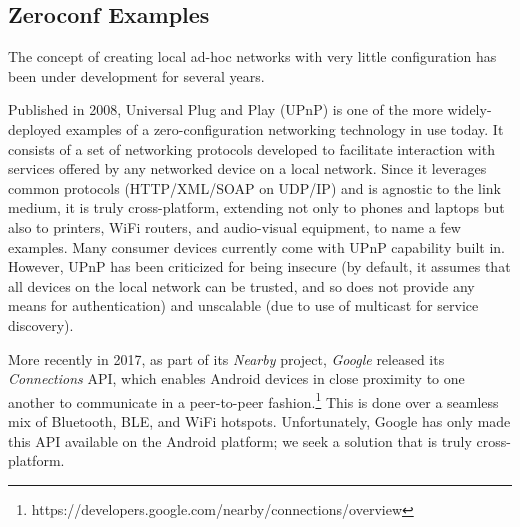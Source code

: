 \subsection{Zeroconf Examples}
\label{sub:background_zeroconf_examples}

The concept of creating local ad-hoc networks with very little configuration has been under development for several years.

Published in 2008, Universal Plug and Play (UPnP) is one of the more widely-deployed examples of a zero-configuration networking technology in use today. 
It consists of a set of networking protocols developed to facilitate interaction with services offered by any networked device on a local network.
Since it leverages common protocols (HTTP/XML/SOAP on UDP/IP) and is agnostic to the link medium, it is truly cross-platform, extending not only to phones and laptops but also to printers, WiFi routers, and audio-visual equipment, to name a few examples.
Many consumer devices currently come with UPnP capability built in.
However, UPnP has been criticized for being insecure (by default, it assumes that all devices on the local network can be trusted, and so does not provide any means for authentication) and unscalable (due to use of multicast for service discovery).

More recently in 2017, as part of its \textit{Nearby} project, \textit{Google} released its \textit{Connections} API, which enables Android devices in close proximity to one another to communicate in a peer-to-peer fashion.\footnote{https://developers.google.com/nearby/connections/overview}
This is done over a seamless mix of Bluetooth, BLE, and WiFi hotspots.
Unfortunately, Google has only made this API available on the Android platform; we seek a solution that is truly cross-platform.
